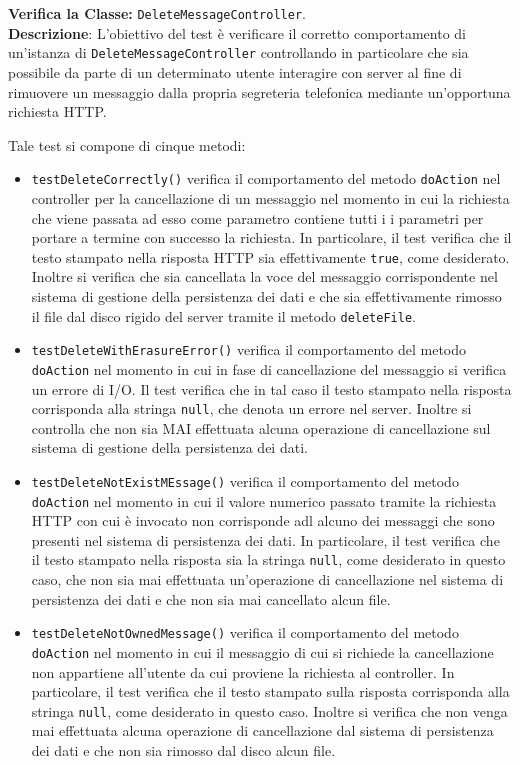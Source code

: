 \begin{itemize}
\textbf{Verifica la Classe:} \texttt{DeleteMessageController}.\\
\textbf{Descrizione}: L'obiettivo del test è verificare il corretto comportamento di un'istanza di \texttt{DeleteMessageController} controllando in particolare che sia possibile da parte di un determinato utente interagire con server al fine di rimuovere un messaggio dalla propria segreteria telefonica mediante un'opportuna richiesta HTTP\@.

Tale test si compone di cinque metodi:
\begin{itemize}
\item \texttt{testDeleteCorrectly()} verifica il comportamento del metodo \texttt{doAction} nel controller per la cancellazione di un messaggio nel momento in cui la richiesta che viene passata ad esso come parametro contiene tutti i i parametri per portare a termine con successo la richiesta. In particolare, il test verifica che il testo stampato nella risposta HTTP sia effettivamente \texttt{true}, come desiderato. Inoltre si verifica che sia cancellata la voce del messaggio corrispondente nel sistema di gestione della persistenza dei dati e che sia effettivamente rimosso il file dal disco rigido del server tramite il metodo \texttt{deleteFile}.

\item \texttt{testDeleteWithErasureError()} verifica il comportamento del metodo \texttt{doAction} nel momento in cui in fase di cancellazione del messaggio si verifica un errore di I/O. Il test verifica che in tal caso il testo stampato nella risposta corrisponda alla stringa \texttt{null}, che denota un errore nel server. Inoltre si controlla che non sia MAI effettuata alcuna operazione di cancellazione sul sistema di gestione della persistenza dei dati.

\item \texttt{testDeleteNotExistMEssage()} verifica il comportamento del metodo \texttt{doAction} nel momento in cui il valore numerico passato tramite la richiesta HTTP con cui è invocato non corrisponde adl alcuno dei messaggi che sono presenti nel sistema di persistenza dei dati. In particolare, il test verifica che il testo stampato nella risposta sia la stringa \texttt{null}, come desiderato in questo caso, che non sia mai effettuata un'operazione di cancellazione nel sistema di persistenza dei dati e che non sia mai cancellato alcun file.

\item \texttt{testDeleteNotOwnedMessage()} verifica il comportamento del metodo \texttt{doAction} nel momento in cui il messaggio di cui si richiede la cancellazione non appartiene all'utente da cui proviene la richiesta al controller. In particolare, il test verifica che il testo stampato sulla risposta corrisponda alla stringa \texttt{null}, come desiderato in questo caso. Inoltre si verifica che non venga mai effettuata alcuna operazione di cancellazione dal sistema di persistenza dei dati e che non sia rimosso dal disco alcun file.


\end{itemize}
\end{itemize}
